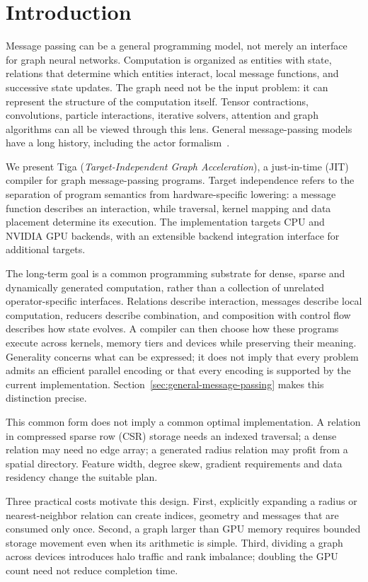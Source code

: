 \section{Introduction}
Message passing can be a general programming model, not merely an interface for
graph neural networks. Computation is organized as entities with state, relations
that determine which entities interact, local message functions, and successive
state updates. The graph need not be the input problem: it can represent the
structure of the computation itself. Tensor contractions, convolutions, particle
interactions, iterative solvers, attention and graph algorithms can all be viewed
through this lens. General message-passing models have a long history, including
the actor formalism~\cite{actors}.

We present Tiga (\emph{Target-Independent Graph Acceleration}), a just-in-time
(JIT) compiler for graph message-passing programs. Target independence refers to
the separation of program semantics from hardware-specific lowering: a message
function describes an interaction, while traversal, kernel mapping and data
placement determine its execution. The implementation targets CPU and NVIDIA
GPU backends, with an extensible backend integration interface for additional targets.

The long-term goal is a common programming substrate for dense, sparse and
dynamically generated computation, rather than a collection of unrelated
operator-specific interfaces. Relations describe interaction, messages describe
local computation, reducers describe combination, and composition with control
flow describes how state evolves. A compiler can then choose how these programs
execute across kernels, memory tiers and devices while preserving their meaning.
Generality concerns what can be expressed; it does not imply that every problem
admits an efficient parallel encoding or that every encoding is supported by the
current implementation. Section~\ref{sec:general-message-passing} makes this
distinction precise.

This common form does not imply a common optimal implementation. A relation in
compressed sparse row (CSR) storage needs an indexed traversal; a dense relation may need no edge array;
a generated radius relation may profit from a spatial directory. Feature width,
degree skew, gradient requirements and data residency change the suitable plan.

Three practical costs motivate this design. First, explicitly expanding a
radius or nearest-neighbor relation can create indices, geometry and messages
that are consumed only once. Second, a graph larger than GPU memory requires
bounded storage movement even when its arithmetic is simple. Third, dividing
a graph across devices introduces halo traffic and rank imbalance; doubling
the GPU count need not reduce completion time.

